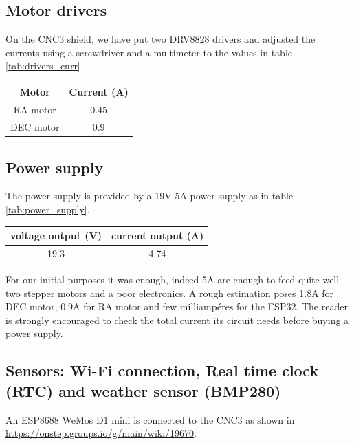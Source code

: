 \documentclass{article}
\begin{document}
\begin{multicols}{2}
        \subsection{Motor drivers}
        On the CNC3 shield, we have put two DRV8828 drivers and adjusted the currents using a screwdriver and a multimeter to the values in table \ref{tab:drivers_curr}

        \begin{minipage}
            {.5\textwidth}
            \centering
            \begin{tabular}{cc}
                Motor & Current (A) \\
                \hline
                RA motor & 0.45 \\
                DEC motor & 0.9 \\                
            \end{tabular}
            \label{tab:drivers_curr}
        \end{minipage}

        \subsection{Power supply}
        The power supply is provided by a 19V 5A power supply as in table \ref{tab:power_supply}.

        \begin{minipage}
            {.5\textwidth}
            \centering
            \begin{tabular}{cc}
                 voltage output (V) & current output (A) \\
                 \hline
                19.3 & 4.74 \\
            \end{tabular}
            \label{tab:power_supply}
        \end{minipage}

        For our initial purposes it was enough, indeed 5A are enough to feed quite well two stepper motors and a poor electronics.
        A rough estimation poses 1.8A for DEC motor, 0.9A for RA motor and few milliampéres for the ESP32. 
        The reader is strongly encouraged to check the total current its circuit needs before buying a power supply.

        \subsection{Sensors: Wi-Fi connection, Real time clock (RTC) and weather sensor (BMP280)}
        An ESP8688 WeMos D1 mini is connected to the CNC3 as shown in \url{https://onstep.groups.io/g/main/wiki/19670}.


\end{multicols}
\end{document}
